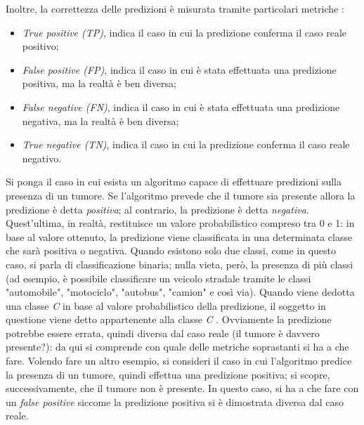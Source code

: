 Inoltre, la correttezza delle predizioni è misurata tramite particolari metriche \cite{verma2018fairness}:
\begin{itemize}
  \item \emph{True positive (TP)}, indica il caso in cui la predizione conferma il caso reale positivo;
  \item \emph{False positive (FP)}, indica il caso in cui è stata effettuata una predizione positiva, ma la realtà è ben diversa;
  \item \emph{False negative (FN)}, indica il caso in cui è stata effettuata una predizione negativa, ma la realtà è ben diversa;
  \item \emph{True negative (TN)}, indica il caso in cui la predizione conferma il caso reale negativo.
\end{itemize}
Si ponga il caso in cui esista un algoritmo capace di effettuare predizioni sulla presenza di un tumore. Se l'algoritmo prevede che il tumore sia presente allora la predizione è detta \emph{positiva}; al contrario, la predizione è detta \emph{negativa}. Quest'ultima, in realtà, restituisce un valore probabilistico compreso tra 0 e 1: in base al valore ottenuto, la predizione viene classificata in una determinata classe che sarà positiva o negativa. Quando esistono solo due classi, come in questo caso, si parla di classificazione binaria; nulla vieta, però, la presenza di più classi (ad esempio, è possibile classificare un veicolo stradale tramite le classi "automobile", "motociclo", "autobus", "camion" e così via). Quando viene dedotta una classe \emph{C} in base al valore probabilistico della predizione, il soggetto in questione viene detto appartenente alla classe \emph{C} \cite{alpaydin2020introduction}. Ovviamente la predizione potrebbe essere errata, quindi diversa dal caso reale (il tumore è davvero presente?): da qui si comprende con quale delle metriche soprastanti si ha a che fare. Volendo fare un altro esempio, si consideri il caso in cui l'algoritmo predice la presenza di un tumore, quindi effettua una predizione positiva; si scopre, successivamente, che il tumore non è presente. In questo caso, si ha a che fare con un \emph{false positive} siccome la predizione positiva si è dimostrata diversa dal caso reale.

